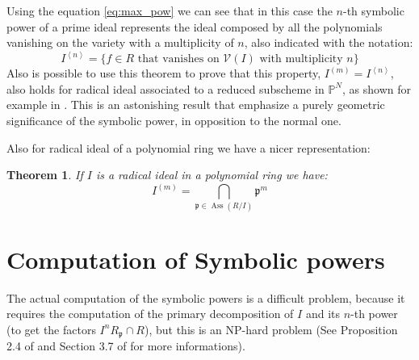 \documentclass[notitlepage, a4]{book}
\theoremstyle{plain}
\newtheorem{teo}{Theorem}[section]
\theoremstyle{remark}
\theoremstyle{definition}
\newcommand{\PP}{\mathbb{P}}
\newcommand{\p}{\mathfrak{p}}
\DeclareMathOperator{\Ass}{Ass}
\begin{document}
Using the equation \ref{eq:max_pow} we can see that in this case the $ n $-th symbolic power of a prime ideal represents the ideal composed by all the polynomials vanishing on the variety with a multiplicity of $ n $, also indicated with the notation:
\begin{equation}\label{eq:ideal_vanish}
	I^{\left<n\right>} = \{ f \in R \text{ that vanishes on } \mathcal{V}(I) \text{ with multiplicity } n\}
\end{equation}
Also is possible to use this theorem to prove that this property, $ I^{(m)} = I^{\left<n\right>} $, also holds for radical ideal associated to a reduced subscheme in $ \PP ^N $, as shown for example in \cite[Corollary 2.9]{Sid09}.
This is an astonishing result that emphasize a purely geometric significance of the symbolic power, in opposition to the normal one. 

Also for radical ideal of a polynomial ring we have a nicer representation:
\begin{teo}\label{teo:sym_radical}
If $ I $ is a radical ideal in a polynomial ring we have:
\begin{equation}
		I^{(m)} = \bigcap_{\p \in \Ass(R/I) } \p^m
	\end{equation}
\end{teo}



\section{Computation of Symbolic powers}

%

The actual computation of the symbolic powers is a difficult problem, because it requires the computation of the primary decomposition of $ I $ and its $ n $-th power (to get the factors $ I^n R_\p \cap R $), but this is an NP-hard problem (See Proposition 2.4 of \cite{Serk02} and Section 3.7 of \cite{Swa17} for more informations). 
\end{document}
